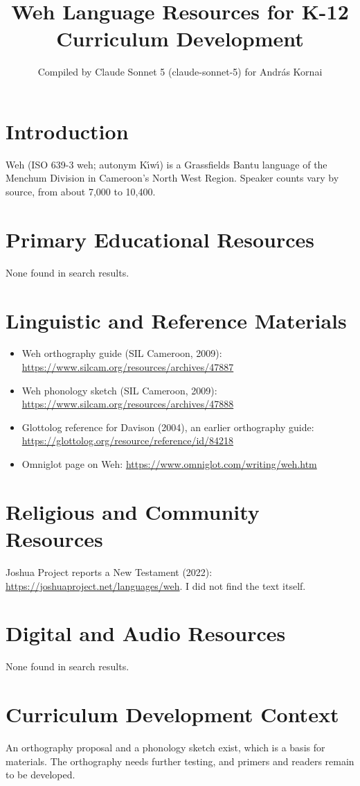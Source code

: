 \documentclass[12pt]{article}
\title{Weh Language Resources for K-12 Curriculum Development}
\author{Compiled by Claude Sonnet 5 (claude-sonnet-5) for Andr\'as Kornai}
\date{}
\begin{document}
\maketitle
\section{Introduction}
Weh (ISO 639-3 weh; autonym K\'\i w\'\i) is a Grassfields Bantu language of the Menchum Division in Cameroon's North West Region. Speaker counts vary by source, from about 7,000 to 10,400.
\section{Primary Educational Resources}
None found in search results.
\section{Linguistic and Reference Materials}
\begin{itemize}
\item Weh orthography guide (SIL Cameroon, 2009): \url{https://www.silcam.org/resources/archives/47887}
\item Weh phonology sketch (SIL Cameroon, 2009): \url{https://www.silcam.org/resources/archives/47888}
\item Glottolog reference for Davison (2004), an earlier orthography guide: \url{https://glottolog.org/resource/reference/id/84218}
\item Omniglot page on Weh: \url{https://www.omniglot.com/writing/weh.htm}
\end{itemize}
\section{Religious and Community Resources}
Joshua Project reports a New Testament (2022): \url{https://joshuaproject.net/languages/weh}. I did not find the text itself.
\section{Digital and Audio Resources}
None found in search results.
\section{Curriculum Development Context}
An orthography proposal and a phonology sketch exist, which is a basis for materials. The orthography needs further testing, and primers and readers remain to be developed.
\end{document}
